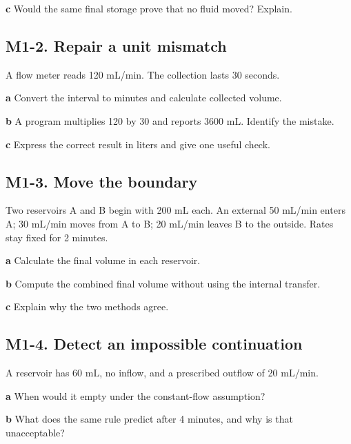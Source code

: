 \documentclass[11pt,letterpaper]{article}
\theoremstyle{definition}\newtheorem{definition}{Definition}\newtheorem{example}{Example}
\numberwithin{equation}{section}
\begin{document}
\textbf{c} Would the same final storage prove that no fluid moved? Explain.

\par\noindent\begin{minipage}{\linewidth}
\subsection*{M1-2. Repair a unit mismatch}
A flow meter reads 120 mL/min. The collection lasts 30 seconds.

\textbf{a} Convert the interval to minutes and calculate collected volume.

\end{minipage}\par\medskip
\textbf{b} A program multiplies 120 by 30 and reports 3600 mL. Identify the mistake.

\textbf{c} Express the correct result in liters and give one useful check.

\par\noindent\begin{minipage}{\linewidth}
\subsection*{M1-3. Move the boundary}
Two reservoirs A and B begin with 200 mL each. An external 50 mL/min enters A; 30 mL/min moves from A to B; 20 mL/min leaves B to the outside. Rates stay fixed for 2 minutes.

\textbf{a} Calculate the final volume in each reservoir.

\end{minipage}\par\medskip
\textbf{b} Compute the combined final volume without using the internal transfer.

\textbf{c} Explain why the two methods agree.

\par\noindent\begin{minipage}{\linewidth}
\subsection*{M1-4. Detect an impossible continuation}
A reservoir has 60 mL, no inflow, and a prescribed outflow of 20 mL/min.

\textbf{a} When would it empty under the constant-flow assumption?

\end{minipage}\par\medskip
\textbf{b} What does the same rule predict after 4 minutes, and why is that unacceptable?
\end{document}
